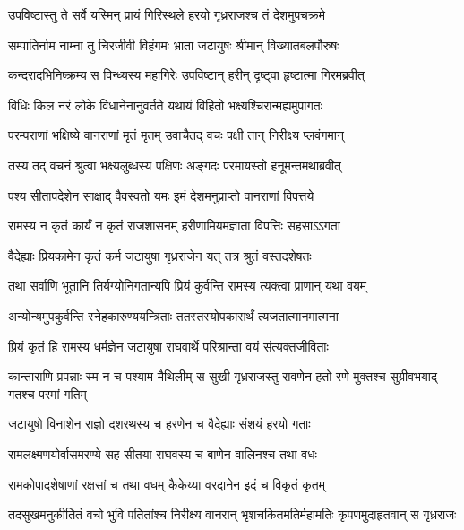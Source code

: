 
\twolineshloka
{उपविष्टास्तु ते सर्वे यस्मिन् प्रायं गिरिस्थले}
{हरयो गृध्रराजश्च तं देशमुपचक्रमे} %

\twolineshloka
{सम्पातिर्नाम नाम्ना तु चिरजीवी विहंगमः}
{भ्राता जटायुषः श्रीमान् विख्यातबलपौरुषः} %

\twolineshloka
{कन्दरादभिनिष्क्रम्य स विन्ध्यस्य महागिरेः}
{उपविष्टान् हरीन् दृष्ट्वा हृष्टात्मा गिरमब्रवीत्} %

\twolineshloka
{विधिः किल नरं लोके विधानेनानुवर्तते}
{यथायं विहितो भक्ष्यश्चिरान्मह्यमुपागतः} %

\twolineshloka
{परम्पराणां भक्षिष्ये वानराणां मृतं मृतम्}
{उवाचैतद् वचः पक्षी तान् निरीक्ष्य प्लवंगमान्} %

\twolineshloka
{तस्य तद् वचनं श्रुत्वा भक्ष्यलुब्धस्य पक्षिणः}
{अङ्गदः परमायस्तो हनूमन्तमथाब्रवीत्} %

\twolineshloka
{पश्य सीतापदेशेन साक्षाद् वैवस्वतो यमः}
{इमं देशमनुप्राप्तो वानराणां विपत्तये} %

\twolineshloka
{रामस्य न कृतं कार्यं न कृतं राजशासनम्}
{हरीणामियमज्ञाता विपत्तिः सहसाऽऽगता} %

\twolineshloka
{वैदेह्याः प्रियकामेन कृतं कर्म जटायुषा}
{गृध्रराजेन यत् तत्र श्रुतं वस्तदशेषतः} %

\twolineshloka
{तथा सर्वाणि भूतानि तिर्यग्योनिगतान्यपि}
{प्रियं कुर्वन्ति रामस्य त्यक्त्वा प्राणान् यथा वयम्} %

\twolineshloka
{अन्योन्यमुपकुर्वन्ति स्नेहकारुण्ययन्त्रिताः}
{ततस्तस्योपकारार्थं त्यजतात्मानमात्मना} %

\twolineshloka
{प्रियं कृतं हि रामस्य धर्मज्ञेन जटायुषा}
{राघवार्थे परिश्रान्ता वयं संत्यक्तजीविताः} %

\threelineshloka
{कान्ताराणि प्रपन्नाः स्म न च पश्याम मैथिलीम्}
{स सुखी गृध्रराजस्तु रावणेन हतो रणे}
{मुक्तश्च सुग्रीवभयाद् गतश्च परमां गतिम्} %

\twolineshloka
{जटायुषो विनाशेन राज्ञो दशरथस्य च}
{हरणेन च वैदेह्याः संशयं हरयो गताः} %

\twolineshloka
{रामलक्ष्मणयोर्वासमरण्ये सह सीतया}
{राघवस्य च बाणेन वालिनश्च तथा वधः} %

\twolineshloka
{रामकोपादशेषाणां रक्षसां च तथा वधम्}
{कैकेय्या वरदानेन इदं च विकृतं कृतम्} %

\twolineshloka
{तदसुखमनुकीर्तितं वचो भुवि पतितांश्च निरीक्ष्य वानरान्}
{भृशचकितमतिर्महामतिः कृपणमुदाहृतवान् स गृध्रराजः} %

